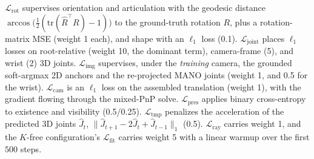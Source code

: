 \documentclass[10pt,twocolumn,letterpaper]{article}
\begin{document}
$\mathcal{L}_{\mathrm{rot}}$ supervises orientation and articulation with the geodesic distance $\arccos\big(\tfrac{1}{2}(\mathrm{tr}(\hat R^{\top}R)-1)\big)$ to the ground-truth rotation $R$, plus a rotation-matrix MSE (weight 1 each), and shape with an $\ell_1$ loss (0.1). $\mathcal{L}_{\mathrm{joint}}$ places $\ell_1$ losses on root-relative (weight 10, the dominant term), camera-frame (5), and wrist (2) 3D joints. $\mathcal{L}_{\mathrm{img}}$ supervises, under the \emph{training} camera, the grounded soft-argmax 2D anchors and the re-projected MANO joints (weight 1, and 0.5 for the wrist). $\mathcal{L}_{\mathrm{cam}}$ is an $\ell_1$ loss on the assembled translation (weight 1), with the gradient flowing through the mixed-PnP solve. $\mathcal{L}_{\mathrm{pres}}$ applies binary cross-entropy to existence and visibility (0.5/0.25). $\mathcal{L}_{\mathrm{tmp}}$ penalizes the acceleration of the predicted 3D joints $\hat J_t$, $\|\hat J_{t+1}-2\hat J_t+\hat J_{t-1}\|_1$ (0.5). $\mathcal{L}_{\mathrm{ray}}$ carries weight 1, and the $K$-free configuration's $\mathcal{L}_{\mathrm{fit}}$ carries weight 5 with a linear warmup over the first $500$ steps.
\end{document}
